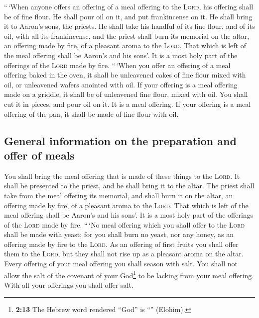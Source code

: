  ``\,`When anyone offers an offering of a meal offering to
the \textsc{Lord}, his offering shall be of fine flour. He shall pour
oil on it, and put frankincense on it.  He shall bring it
to Aaron's sons, the priests. He shall take his handful of its fine
flour, and of its oil, with all its frankincense, and the priest shall
burn its memorial on the altar, an offering made by fire, of a pleasant
aroma to the \textsc{Lord}.  That which is left of the
meal offering shall be Aaron's and his sons'. It is a most holy part of
the offerings of the \textsc{Lord} made by fire. 
``\,`When you offer an offering of a meal offering baked in the oven, it
shall be unleavened cakes of fine flour mixed with oil, or unleavened
wafers anointed with oil.  If your offering is a meal
offering made on a griddle, it shall be of unleavened fine flour, mixed
with oil.  You shall cut it in pieces, and pour oil on it.
It is a meal offering.  If your offering is a meal
offering of the pan, it shall be made of fine flour with oil.

\hypertarget{general-information-on-the-preparation-and-offer-of-meals}{%
\subsection{General information on the preparation and offer of
meals}\label{general-information-on-the-preparation-and-offer-of-meals}}

 You shall bring the meal offering that is made of these
things to the \textsc{Lord}. It shall be presented to the priest, and he
shall bring it to the altar.  The priest shall take from
the meal offering its memorial, and shall burn it on the altar, an
offering made by fire, of a pleasant aroma to the \textsc{Lord}.
 That which is left of the meal offering shall be Aaron's
and his sons'. It is a most holy part of the offerings of the
\textsc{Lord} made by fire.  ``\,`No meal offering which
you shall offer to the \textsc{Lord} shall be made with yeast; for you
shall burn no yeast, nor any honey, as an offering made by fire to the
\textsc{Lord}.  As an offering of first fruits you shall
offer them to the \textsc{Lord}, but they shall not rise up as a
pleasant aroma on the altar.  Every offering of your meal
offering you shall season with salt. You shall not allow the salt of the
covenant of your God\footnote{\textbf{2:13} The Hebrew word rendered
  ``God'' is ``'' (Elohim).} to be lacking from your meal
offering. With all your offerings you shall offer salt.

